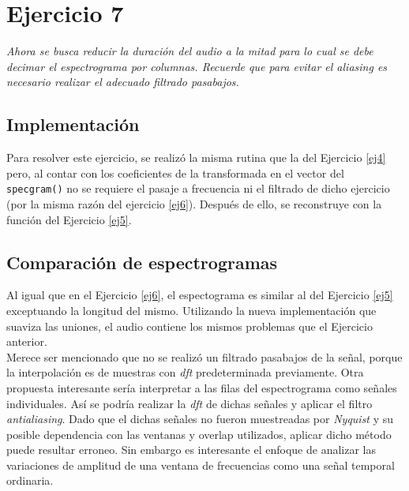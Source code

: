 

\section{Ejercicio 7} \label{ej7}
	\begin{flushleft}
		\textit{Ahora se busca reducir la duración del audio a la mitad para lo cual se debe decimar el
espectrograma por columnas. Recuerde que para evitar el aliasing es necesario realizar el
adecuado filtrado pasabajos.}
	\end{flushleft}

	\subsection{Implementación}

	Para resolver este ejercicio, se realizó la misma rutina que la del Ejercicio \ref{ej4}	pero, al contar con los coeficientes de la transformada en el vector del \texttt{specgram()} no se requiere el pasaje a frecuencia ni el filtrado de dicho ejercicio (por la misma razón del ejercicio \ref{ej6}). Después de ello, se reconstruye con la función del Ejercicio \ref{ej5}.

	\subsection{Comparación de espectrogramas}



	Al igual que en el Ejercicio \ref{ej6}, el espectograma es similar al del Ejercicio \ref{ej5} exceptuando la longitud del mismo. Utilizando la nueva implementación que suaviza las uniones, el audio contiene los mismos problemas que el Ejercicio anterior.\\

	Merece ser mencionado que no se realizó un filtrado pasabajos de la señal, porque la interpolación es de muestras con \emph{dft} predeterminada previamente. Otra propuesta interesante sería interpretar a las filas del espectrograma como señales individuales. Así se podría realizar la \emph{dft} de dichas señales y aplicar el filtro \emph{antialiasing}. Dado que el dichas señales no fueron muestreadas por \emph{Nyquist} y su posible dependencia con las ventanas y overlap utilizados, aplicar dicho método puede resultar erroneo. Sin embargo es interesante el enfoque de analizar las variaciones de amplitud de una ventana de frecuencias como una señal temporal ordinaria.
